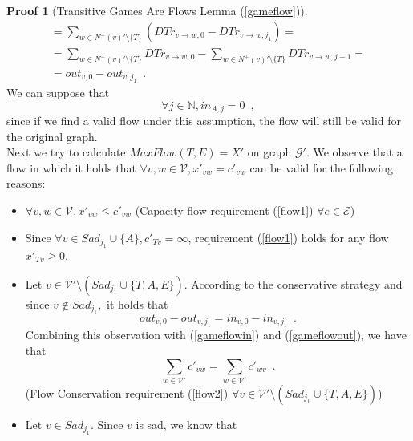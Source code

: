 \documentclass[11pt]{llncs}
\theoremstyle{definition}
\newtheorem*{sepproof}{Proof}
\begin{document}
\begin{sepproof}[Transitive Games Are Flows Lemma (\ref{gameflow})]
\begin{equation}
\begin{gathered}
          = \sum\limits_{w \in N^{+}\left(v\right)' \setminus \{T\}}\left(DTr_{v \rightarrow w, 0} -
          DTr_{v \rightarrow w, j_1}\right) = \\
          = \sum\limits_{w \in N^{+}\left(v\right)' \setminus \{T\}}DTr_{v \rightarrow w, 0} -
          \sum\limits_{w \in N^{+}\left(v\right)' \setminus \{T\}}DTr_{v \rightarrow w, j-1} = \\
          = out_{v, 0} - out_{v, j_1} \enspace.
       \end{gathered}
       \end{equation}
       We can suppose that
       \begin{equation}
       \label{Aincoming}
          \forall j \in \mathbb{N}, in_{A, j} = 0 \enspace,
       \end{equation}
       since if we find a valid flow under this assumption, the flow will still be valid for the original graph. \\
       Next we try to calculate $MaxFlow\left(T, E\right) = X'$ on graph $\mathcal{G}'$. We observe that a flow in which it
       holds that $\forall v, w \in \mathcal{V}, x'_{vw} = c'_{vw}$ can be valid for the following reasons:
       \begin{itemize}
          \item $\forall v,w \in \mathcal{V}, x'_{vw} \leq c'_{vw}$ (Capacity flow requirement (\ref{flow1}) $\forall e \in
          \mathcal{E}$)
          \item Since $\forall v \in Sad_{j_1} \cup \{A\}, c'_{Tv} = \infty$, requirement (\ref{flow1}) holds for any flow
          $x'_{Tv} \geq 0$.
          \item Let $v \in \mathcal{V}' \setminus \left(Sad_{j_1} \cup \{T, A, E\}\right)$. According to the conservative
          strategy and since $v \notin Sad_{j_1},$ it holds that
          \begin{equation*}
             out_{v, 0} - out_{v, j_1} = in_{v, 0} - in_{v, j_1} \enspace.
          \end{equation*}
          Combining this observation with (\ref{gameflowin}) and (\ref{gameflowout}), we have that
          \begin{equation*}
             \sum\limits_{w \in \mathcal{V}'}c'_{vw} = \sum\limits_{w \in \mathcal{V}'}c'_{wv} \enspace.
          \end{equation*}
          (Flow Conservation requirement (\ref{flow2}) $\forall v \in \mathcal{V}' \setminus \left(Sad_{j_1}
          \cup \{T, A, E\}\right)$)
          \item Let $v \in Sad_{j_1}$. Since $v$ is sad, we know that

\end{itemize}
\end{sepproof}
\end{document}
